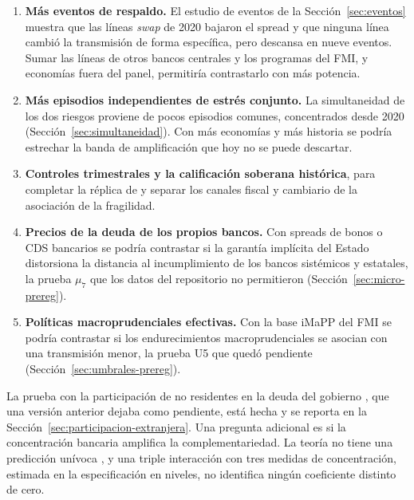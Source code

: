 \begin{enumerate}
\item \textbf{Más eventos de respaldo.} El estudio de eventos de la Sección~\ref{sec:eventos} muestra que las líneas \textit{swap} de 2020 bajaron el spread y que ninguna línea cambió la transmisión de forma específica, pero descansa en nueve eventos. Sumar las líneas de otros bancos centrales y los programas del FMI, y economías fuera del panel, permitiría contrastarlo con más potencia.
\item \textbf{Más episodios independientes de estrés conjunto.} La simultaneidad de los dos riesgos proviene de pocos episodios comunes, concentrados desde 2020 (Sección~\ref{sec:simultaneidad}). Con más economías y más historia se podría estrechar la banda de amplificación que hoy no se puede descartar.
\item \textbf{Controles trimestrales y la calificación soberana histórica}, para completar la réplica de \citet{Chari2024b} y separar los canales fiscal y cambiario de la asociación de la fragilidad.
\item \textbf{Precios de la deuda de los propios bancos.} Con spreads de bonos o CDS bancarios se podría contrastar si la garantía implícita del Estado distorsiona la distancia al incumplimiento de los bancos sistémicos y estatales, la prueba $\mu_7$ que los datos del repositorio no permitieron (Sección~\ref{sec:micro-prereg}).
\item \textbf{Políticas macroprudenciales efectivas.} Con la base iMaPP del FMI \citep[sin acceso público directo al cierre de este trabajo;][]{AlamEtAl2019} se podría contrastar si los endurecimientos macroprudenciales se asocian con una transmisión menor, la prueba U5 que quedó pendiente (Sección~\ref{sec:umbrales-prereg}).
\end{enumerate}

La prueba con la participación de no residentes en la deuda del gobierno \citep{ArslanalpTsuda2014}, que una versión anterior dejaba como pendiente, está hecha y se reporta en la Sección~\ref{sec:participacion-extranjera}. Una pregunta adicional es si la concentración bancaria amplifica la complementariedad. La teoría no tiene una predicción unívoca \citep{MMR2010b,BoydDeNicolo2005}, y una triple interacción con tres medidas de concentración, estimada en la especificación en niveles, no identifica ningún coeficiente distinto de cero.
